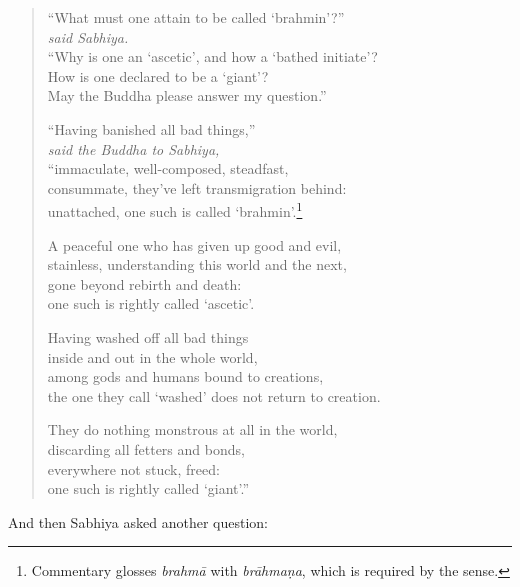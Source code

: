 \documentclass[12pt,openany]{book}%
\newcommand*{\scspeaker}[1]{\hspace{2em}\textit{#1}}
\begin{document}
\begin{verse}%
“What must one attain to be called ‘brahmin’?” \\
\scspeaker{said Sabhiya. }\\
“Why is one an ‘ascetic’, and how a ‘bathed initiate’? \\
How is one declared to be a ‘giant’? \\
May the Buddha please answer my question.” 

“Having banished all bad things,” \\
\scspeaker{said the Buddha to Sabhiya, }\\
“immaculate, well-composed, steadfast, \\
consummate, they’ve left transmigration behind: \\
unattached, one such is called ‘brahmin’.\footnote{Commentary glosses \textit{\textsanskrit{brahmā}} with \textit{\textsanskrit{brāhmaṇa}}, which is required by the sense. } 

A peaceful one who has given up good and evil, \\
stainless, understanding this world and the next, \\
gone beyond rebirth and death: \\
one such is rightly called ‘ascetic’. 

Having washed off all bad things \\
inside and out in the whole world, \\
among gods and humans bound to creations, \\
the one they call ‘washed’ does not return to creation. 

They do nothing monstrous at all in the world, \\
discarding all fetters and bonds, \\
everywhere not stuck, freed: \\
one such is rightly called ‘giant’.” 

%
\end{verse}

And then Sabhiya asked another question: 
\end{document}
